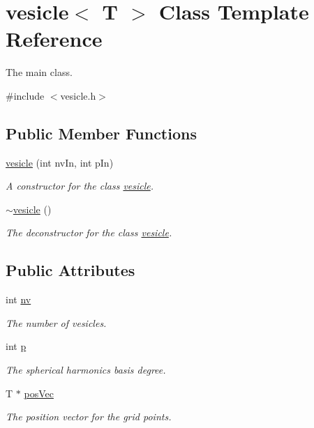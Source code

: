 \hypertarget{classvesicle}{
\section{vesicle$<$ T $>$ Class Template Reference}
\label{classvesicle}
}


The main class.  


{\ttfamily \#include $<$vesicle.h$>$}\subsection*{Public Member Functions}
\begin{DoxyCompactItemize}
\item 
\hyperlink{classvesicle_ac6b846421ac3c6b5d919ef8e9209fbad}{vesicle} (int nvIn, int pIn)
\begin{DoxyCompactList}\small\item\em A constructor for the class \hyperlink{classvesicle}{vesicle}. \item\end{DoxyCompactList}\item 
\hyperlink{classvesicle_a2ee2cc68356721b787bf7fe60b9ce08e}{$\sim$vesicle} ()
\begin{DoxyCompactList}\small\item\em The deconstructor for the class \hyperlink{classvesicle}{vesicle}. \item\end{DoxyCompactList}\end{DoxyCompactItemize}
\subsection*{Public Attributes}
\begin{DoxyCompactItemize}
\item 
\hypertarget{classvesicle_a02e23211774527a8dec82c741ea6899b}{
int \hyperlink{classvesicle_a02e23211774527a8dec82c741ea6899b}{nv}}
\label{classvesicle_a02e23211774527a8dec82c741ea6899b}

\begin{DoxyCompactList}\small\item\em The number of vesicles. \item\end{DoxyCompactList}\item 
int \hyperlink{classvesicle_a34acbe9c962bc2be315cfa096989241e}{p}
\begin{DoxyCompactList}\small\item\em The spherical harmonics basis degree. \item\end{DoxyCompactList}\item 
\hypertarget{classvesicle_a71e0e239fe1da969271b5f3bb97456b5}{
T $\ast$ \hyperlink{classvesicle_a71e0e239fe1da969271b5f3bb97456b5}{posVec}}
\label{classvesicle_a71e0e239fe1da969271b5f3bb97456b5}

\begin{DoxyCompactList}\small\item\em The position vector for the grid points. \item\end{DoxyCompactList}\end{DoxyCompactItemize}
